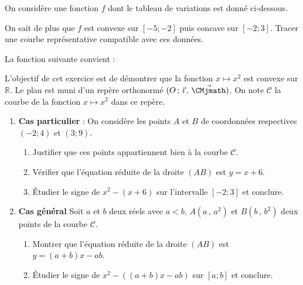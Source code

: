 \documentclass[11pt,fleqn, openany]{book} %
\begin{document}
\begin{exercise}On considère une fonction $f$ dont le tableau de variations est donné ci-dessous.
\begin{center}
\end{center}

On sait de plus que $f$ est convexe sur $[-5;-2]$ puis concave sur $[-2;3]$. Tracer une courbe représentative compatible avec ces données.\end{exercise}

\begin{solution}La fonction suivante convient : 

\begin{center}
\end{center}
\end{solution}




\begin{exercise}L'objectif de cet exercice est de démontrer que la fonction $x\mapsto x^2$ est convexe sur $\mathbb{R}$. Le plan est muni d'un repère orthonormé $\Oij$. On note $\mathcal{C}$ la courbe de la fonction $x\mapsto x^2$ dans ce repère.
\begin{enumerate}
\item \textbf{Cas particulier} : On considère les points $A$ et $B$ de coordonnées respectives $(-2;4)$ et $(3;9)$.
\begin{enumerate}
\item Justifier que ces points appartiennent bien à la courbe $\mathcal{C}$.
\item Vérifier que l'équation réduite de la droite $(AB)$ est $y=x+6$.
\item Étudier le signe de $x^2-(x+6)$ sur l'intervalle $[-2;3]$ et conclure.
\end{enumerate}
\item \textbf{Cas général} Soit $a$ et $b$ deux réels avec $a<b$, $A(a\,,\,a^2)$ et $B(b\,,\,b^2)$ deux points de la courbe $\mathcal{C}$.
\begin{enumerate}
\item Montrer que l'équation réduite de la droite $(AB)$ est $y=(a+b)x-ab$.
\item Étudier le signe de $x^2-((a+b)x-ab)$ sur $[a;b]$ et conclure.
\end{enumerate}
\end{enumerate}\end{exercise}
\end{document}
